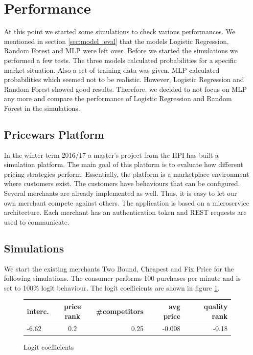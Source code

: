 \section{Performance}
\label{sec:performance}
    At this point we started some simulations to check various performances. We mentioned in section \ref{sec:model_eval} that the models Logistic Regression, Random Forest and MLP were left over. Before we started the simulations we performed a few tests. The three models calculated probabilities for a specific market situation. Also a set of training data was given. MLP calculated probabilities which seemed not to be realistic. However, Logistic Regression and Random Forest showed good results. Therefore, we decided to not focus on MLP any more and compare the performance of Logistic Regression and Random Forest in the simulations.

\subsection{Pricewars Platform}
\label{sec:platform}
    In the winter term 2016/17 a master's project from the HPI has built a simulation platform. The main goal of this platform is to evaluate how different pricing strategies perform. Essentially, the platform is a marketplace environment where customers exist. The customers have behaviours that can be configured. Several merchants are already implemented as well. Thus, it is easy to let our own merchant compete against others. The application is based on a microservice architecture. Each merchant has an authentication token and REST requests are used to communicate.

\subsection{Simulations}
    We start the existing merchants Two Bound, Cheapest and Fix Price for the following simulations. The consumer performs 100 purchases per minute and is set to 100\% logit behaviour. The logit coefficients are shown in figure \ref{fig1}.
    \begin{figure}[ht]
    \centering
        \begin{tabular}{ l | c | r | r | r}
            interc. & price rank & \#competitors & avg price & quality rank \\
            \hline  
            -6.62 & 0.2 & 0.25 & -0.008 & -0.18 \\
        \end{tabular}
    \caption{Logit coefficients}
    \label{fig1}
    \end{figure}

